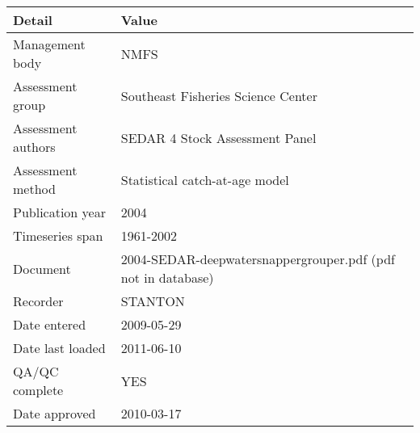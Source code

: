 \begin{table}[htb]
\centering
\begin{tabular}{lp{7cm}}
\toprule
Detail & Value \\
\midrule
Management body    & NMFS                                                         \\
Assessment group   & Southeast Fisheries Science Center                           \\
Assessment authors & SEDAR 4 Stock Assessment Panel                               \\
Assessment method  & Statistical catch-at-age model                               \\
Publication year   & 2004                                                         \\
Timeseries span    & 1961-2002                                                    \\
Document           & 2004-SEDAR-deepwatersnappergrouper.pdf (pdf not in database) \\
Recorder           & STANTON                                                      \\
Date entered       & 2009-05-29                                                   \\
Date last loaded   & 2011-06-10                                                   \\
QA/QC complete     & YES                                                          \\
Date approved      & 2010-03-17                                                   \\
\bottomrule
\end{tabular}
\label{tab:assessdet}
\end{table}
